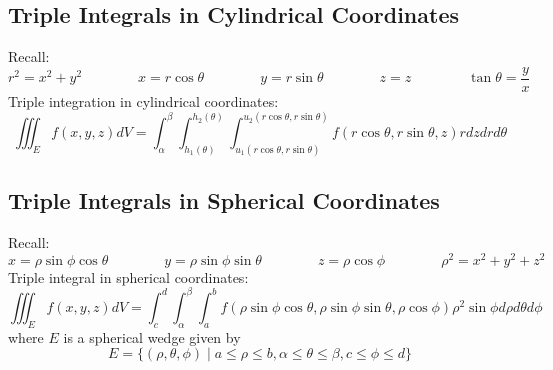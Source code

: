 \documentclass{article}
\begin{document}
    \subsection{Triple Integrals in Cylindrical Coordinates}
    \begin{outline}
        \1 Recall: \[r^2=x^2+y^2\qquad\qquad x=r\cos\theta\qquad\qquad y=r\sin\theta\qquad\qquad z=z\qquad\qquad\tan\theta=\dfrac{y}{x}\]
        \1 Triple integration in cylindrical coordinates: \[\iiint_Ef(x,y,z)dV=\int_\alpha^\beta\int_{h_1(\theta)}^{h_2(\theta)}\int_{u_1(r\cos\theta,r\sin\theta)}^{u_2(r\cos\theta,r\sin\theta)}f(r\cos\theta,r\sin\theta,z)rdzdrd\theta\]

    \end{outline}
    \subsection{Triple Integrals in Spherical Coordinates}
    \begin{outline}
        \1 Recall: \[x=\rho\sin\phi\cos\theta\qquad\qquad y=\rho\sin\phi\sin\theta\qquad\qquad z=\rho\cos\phi \qquad\qquad\rho^2=x^2+y^2+z^2\]
        \1 Triple integral in spherical coordinates: \[\iiint_Ef(x,y,z)dV=\int^d_c\int^\beta_\alpha\int^b_af(\rho\sin\phi\cos\theta,\rho\sin\phi\sin\theta,\rho\cos\phi)\rho^2\sin\phi d\rho d\theta d\phi\] where $E$ is a spherical wedge given by \[E=\{(\rho,\theta,\phi)\;|\; a\leq\rho\leq b,\alpha\leq\theta\leq\beta, c\leq\phi\leq d\}\]

    \end{outline}
\end{document}
